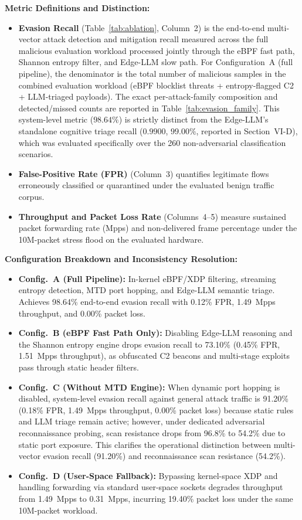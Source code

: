 \documentclass{ieeeaccess}
\renewcommand{\_}{\textunderscore\allowbreak}
\begin{document}
\textbf{Metric Definitions and Distinction:}
\begin{itemize}
  \item \textbf{Evasion Recall} (Table~\ref{tab:ablation}, Column~2) is the end-to-end
    multi-vector attack detection and mitigation recall measured across the full malicious
    evaluation workload processed jointly through the eBPF fast path, Shannon entropy
    filter, and Edge-LLM slow path. For Configuration~A (full pipeline), the
    denominator is the total number of malicious samples in the combined evaluation
    workload (eBPF blocklist threats + entropy-flagged C2 + LLM-triaged payloads).
    The exact per-attack-family composition and detected/missed counts are reported in
    Table~\ref{tab:evasion_family}. This system-level metric ($\mathbf{98.64\%}$)
    is strictly distinct from the Edge-LLM's standalone cognitive triage recall
    ($0.9900$, $99.00\%$, reported in Section~VI-D), which was evaluated specifically
    over the 260 non-adversarial classification scenarios.
  \item \textbf{False-Positive Rate (FPR)} (Column~3) quantifies legitimate flows
    erroneously classified or quarantined under the evaluated benign traffic corpus.
  \item \textbf{Throughput and Packet Loss Rate} (Columns~4--5) measure sustained
    packet forwarding rate (Mpps) and non-delivered frame percentage under the
    10M-packet stress flood on the evaluated hardware.
\end{itemize}

\textbf{Configuration Breakdown and Inconsistency Resolution:}
\begin{itemize}
  \item \textbf{Config.~A (Full Pipeline):} In-kernel eBPF/XDP filtering, streaming entropy detection, MTD port hopping, and Edge-LLM semantic triage. Achieves 98.64\% end-to-end evasion recall with 0.12\% FPR, 1.49~Mpps throughput, and 0.00\% packet loss.
  \item \textbf{Config.~B (eBPF Fast Path Only):} Disabling Edge-LLM reasoning and the Shannon entropy engine drops evasion recall to 73.10\% (0.45\% FPR, 1.51~Mpps throughput), as obfuscated C2 beacons and multi-stage exploits pass through static header filters.
  \item \textbf{Config.~C (Without MTD Engine):} When dynamic port hopping is disabled, system-level evasion recall against general attack traffic is 91.20\% (0.18\% FPR, 1.49~Mpps throughput, 0.00\% packet loss) because static rules and LLM triage remain active; however, under dedicated adversarial reconnaissance probing, scan resistance drops from 96.8\% to 54.2\% due to static port exposure. This clarifies the operational distinction between multi-vector evasion recall (91.20\%) and reconnaissance scan resistance (54.2\%).
  \item \textbf{Config.~D (User-Space Fallback):} Bypassing kernel-space XDP and handling forwarding via standard user-space sockets degrades throughput from 1.49~Mpps to 0.31~Mpps, incurring 19.40\% packet loss under the same 10M-packet workload.
\end{itemize}
\end{document}

